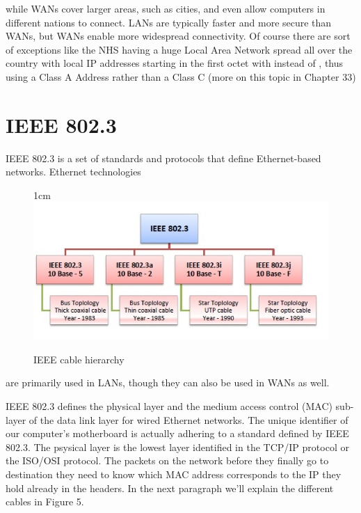 \documentclass[a4paper,12pt]{article}
\begin{document}
\noindent while WANs cover larger areas, such as cities, and even allow computers in different nations to connect.
LANs are typically faster and more secure than WANs, but WANs enable more widespread connectivity. Of course there are sort of exceptions like the NHS having a huge Local Area Network spread all over the country with local IP addresses starting in the first octet with  instead of , thus using a Class A Address rather than a Class C (more on this topic in Chapter 33) 



\clearpage



\section{IEEE 802.3}

IEEE 802.3 is a set of standards and protocols that define Ethernet-based networks. Ethernet technologies
\begin{figure}[16]{1cm}
\centering
\includegraphics[width=13cm]{./ieee_802.jpg}
\vspace{-15pt}
\caption{IEEE cable hierarchy}\label{wrap-fig:2}
\end{figure}

\noindent are primarily used in LANs, though they can also be used in WANs as well.

IEEE 802.3 defines the physical layer and the medium access control (MAC) sub-layer of the data link layer for wired Ethernet networks. The unique identifier of our computer's motherboard is actually adhering to a standard defined by IEEE 802.3.
The psysical layer is the lowest layer identified in the TCP/IP protocol or the ISO/OSI protocol. The packets on the network before they finally go to destination they need to know which MAC address corresponds to the IP they hold already in the headers. In the next paragraph we'll explain the different cables in Figure 5.
\end{document}
